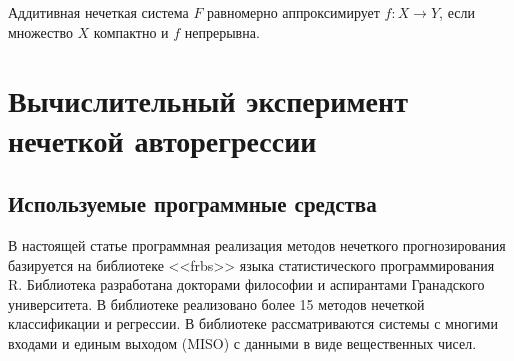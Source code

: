 \begin{theorem}
	\label{theorem:FAT}
	Аддитивная нечеткая система  $F$ равномерно аппроксимирует $f: X\rightarrow Y$, если множество $X$ компактно и $f$ непрерывна.
\end{theorem}

\section{Вычислительный эксперимент нечеткой авторегрессии}

\subsection{Используемые программные средства}

В настоящей статье программная реализация методов нечеткого прогнозирования
базируется на библиотеке <<frbs>> языка статистического программирования R. Библиотека разработана докторами философии и аспирантами Гранадского университета. В библиотеке реализовано более 15 методов нечеткой классификации и регрессии. В библиотеке рассматриваются системы с многими входами и единым выходом (MISO) с данными в виде вещественных чисел.

